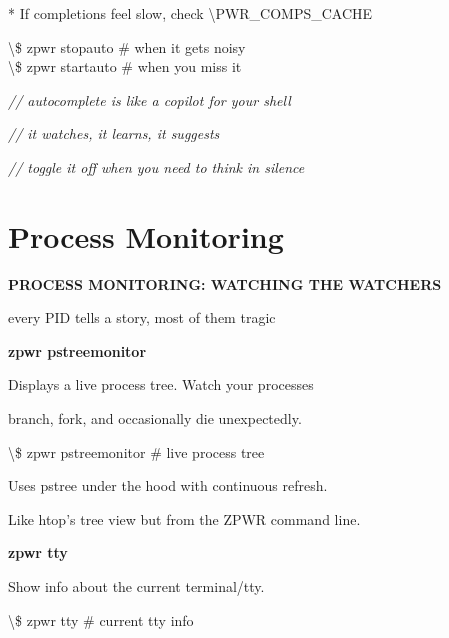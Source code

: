 \documentclass[11pt,a4paper,twoside]{book}
\begin{document}
* If completions feel slow, check \textbackslash{}PWR\_COMPS\_CACHE

\begin{codebox}
\textbackslash{}\$ zpwr stopauto               \# when it gets noisy\\
\textbackslash{}\$ zpwr startauto              \# when you miss it\\
\end{codebox}

{\small\itshape\color{dimtext} // autocomplete is like a copilot for your shell}

{\small\itshape\color{dimtext} // it watches, it learns, it suggests}

{\small\itshape\color{dimtext} // toggle it off when you need to think in silence}


\vspace{16pt}

\section{Process Monitoring}


\vspace{10pt}
{\large\bfseries\color{neoncyan} PROCESS MONITORING: WATCHING THE WATCHERS}\vspace{6pt}

every PID tells a story, most of them tragic


\vspace{12pt}
{\bfseries\color{neonyellow} zpwr pstreemonitor}\vspace{4pt}

Displays a live process tree. Watch your processes

branch, fork, and occasionally die unexpectedly.

\begin{codebox}
\textbackslash{}\$ zpwr pstreemonitor          \# live process tree\\
\end{codebox}

Uses pstree under the hood with continuous refresh.

Like htop's tree view but from the ZPWR command line.


\vspace{12pt}
{\bfseries\color{neonyellow} zpwr tty}\vspace{4pt}

Show info about the current terminal/tty.

\begin{codebox}
\textbackslash{}\$ zpwr tty                    \# current tty info\\
\end{codebox}
\end{document}
